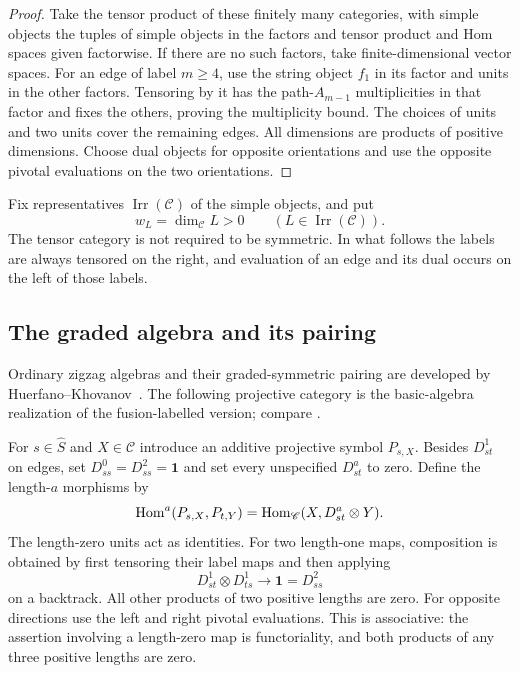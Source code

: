 \begin{proof}
Take the tensor product of these finitely many categories, with simple
objects the tuples of simple objects in the factors and tensor product
and Hom spaces given factorwise. If there are no such factors, take
finite-dimensional vector spaces. For an edge of label $m\geq4$, use
the string object $f_1$ in its factor and units in the other factors.
Tensoring by it has the path-$A_{m-1}$ multiplicities in that factor and
fixes the others, proving the multiplicity bound. The choices of units
and two units cover the remaining edges. All dimensions are products
of positive dimensions. Choose dual objects for opposite orientations
and use the opposite pivotal evaluations on the two orientations.
\end{proof}

Fix representatives $\operatorname{Irr}(\mathscr C)$ of the simple
objects, and put
\[
 w_L=\dim_{\mathscr C}L>0
 \qquad(L\in\operatorname{Irr}(\mathscr C)).
\]
The tensor category is not required to be symmetric. In what follows
the labels are always tensored on the right, and evaluation of an edge
and its dual occurs on the left of those labels.

\subsection{The graded algebra and its pairing}

Ordinary zigzag algebras and their graded-symmetric pairing are developed
by Huerfano--Khovanov~\cite[Section~3, Proposition~1]{HuerfanoKhovanov2001}.
The following projective category is the basic-algebra realization of
the fusion-labelled version; compare
\cite[Section~4.4, Proposition~4.13]{HengLicata2024}.

For $s\in\widehat S$ and $X\in\mathscr C$ introduce an additive
projective symbol $P_{s,X}$. Besides $D^1_{st}$ on edges, set
$D^0_{ss}=D^2_{ss}=\mathbf1$ and set every unspecified $D^a_{st}$ to
zero. Define the length-$a$ morphisms by
\begin{equation}
 \operatorname{Hom}^a(P_{s,X},P_{t,Y})
   =\operatorname{Hom}_{\mathscr C}(X,D^a_{st}\otimes Y).
 \label{eq:category-projective-hom}
\end{equation}
The length-zero units act as identities. For two length-one maps,
composition is obtained by first tensoring their label maps and then
applying
\[
 D^1_{st}\otimes D^1_{ts}\longrightarrow\mathbf1=D^2_{ss}
\]
on a backtrack. All other products of two positive lengths are zero.
For opposite directions use the left and right pivotal evaluations.
This is associative: the assertion involving a length-zero map is
functoriality, and both products of any three positive lengths are
zero.

